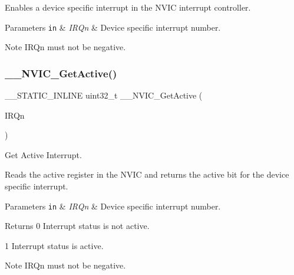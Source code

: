 Enables a device specific interrupt in the N\+V\+IC interrupt controller. 
\begin{DoxyParams}[1]{Parameters}
\mbox{\tt in}  & {\em I\+R\+Qn} & Device specific interrupt number. \\
\hline
\end{DoxyParams}
\begin{DoxyNote}{Note}
I\+R\+Qn must not be negative. 
\end{DoxyNote}
\mbox{\label{group___c_m_s_i_s___core___n_v_i_c_functions_gaa2837003c28c45abf193fe5e8d27f593}} 
\subsubsection{\texorpdfstring{\+\_\+\+\_\+\+N\+V\+I\+C\+\_\+\+Get\+Active()}{\_\_NVIC\_GetActive()}}
{\footnotesize\ttfamily \+\_\+\+\_\+\+S\+T\+A\+T\+I\+C\+\_\+\+I\+N\+L\+I\+NE uint32\+\_\+t \+\_\+\+\_\+\+N\+V\+I\+C\+\_\+\+Get\+Active (\begin{DoxyParamCaption}\item[{\hyperlink{group___peripheral__interrupt__number__definition_ga7e1129cd8a196f4284d41db3e82ad5c8}{I\+R\+Qn\+\_\+\+Type}}]{I\+R\+Qn }\end{DoxyParamCaption})}



Get Active Interrupt. 

Reads the active register in the N\+V\+IC and returns the active bit for the device specific interrupt. 
\begin{DoxyParams}[1]{Parameters}
\mbox{\tt in}  & {\em I\+R\+Qn} & Device specific interrupt number. \\
\hline
\end{DoxyParams}
\begin{DoxyReturn}{Returns}
0 Interrupt status is not active. 

1 Interrupt status is active. 
\end{DoxyReturn}
\begin{DoxyNote}{Note}
I\+R\+Qn must not be negative. 
\end{DoxyNote}
\mbox{\label{group___c_m_s_i_s___core___n_v_i_c_functions_gaaeb5e7cc0eaad4e2817272e7bf742083}} 
